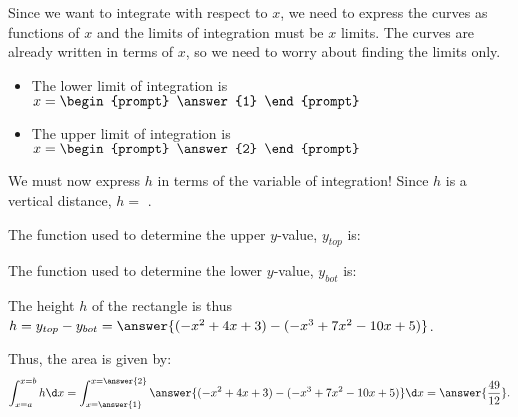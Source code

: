 \documentclass{ximera}
\begin{document}
\begin{exercise}
\begin{image}
\end{image}

Since we want to integrate with respect to $x$, we need to express the curves as functions of $x$ and the limits of integration must be $x$ limits.  The curves are already written in terms of $x$, so we need to worry about finding the limits only.

\begin{itemize}
\item The lower limit of integration is $x= \begin{prompt} \answer{1} \end{prompt}$ 
\item The upper limit of integration is $x= \begin{prompt} \answer{2} \end{prompt}$
\end{itemize}

We must now express $h$ in terms of the variable of integration!  Since $h$ is a vertical distance, $h=$ .

The function used to determine the upper $y$-value, $y_{top}$ is:
\begin{multipleChoice}
\end{multipleChoice}

The function used to determine the lower $y$-value, $y_{bot}$ is:
\begin{multipleChoice}
\end{multipleChoice}

The height $h$ of the rectangle is thus $h=y_{top}-y_{bot} = \answer{( -x^2+4x+3)-(-x^3+7x^2-10x+5)}$.

Thus, the area is given by:
  \[
 \int_{x=a}^{x=b} h \d x =  \int_{x=\answer{1}}^{x=\answer{2}} \answer{( -x^2+4x+3)-(-x^3+7x^2-10x+5) } \d x = \answer{\frac{49}{12}}.
  \]

\end{exercise}
\end{document}
